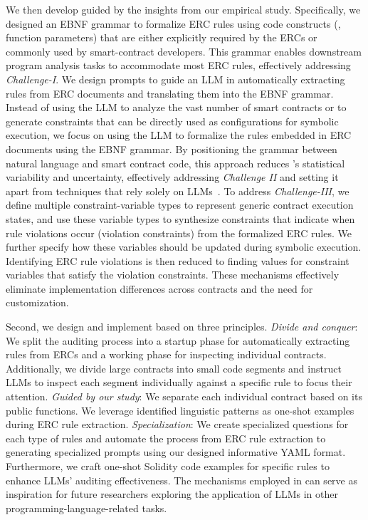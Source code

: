 We then develop \Tool{} guided by the insights from our empirical study. 
Specifically, we designed an EBNF grammar to formalize ERC rules using code constructs (\eg, function parameters) that are either explicitly required by the ERCs 
or commonly used by smart-contract developers. 
This grammar enables downstream program analysis tasks to 
accommodate most ERC rules, effectively addressing \textit{Challenge-I}.
%
We design prompts to guide an LLM in automatically extracting 
rules from ERC documents and translating them into the EBNF grammar. 
Instead of using the LLM to analyze the vast number of smart contracts 
or to generate constraints that can be directly used as configurations 
for symbolic execution, we focus on using the LLM to formalize the rules 
embedded in ERC documents using the EBNF grammar. 
By positioning the grammar between natural language 
and smart contract code, this approach reduces \Tool{}’s statistical variability 
and uncertainty, effectively addressing \textit{Challenge II} and setting it apart from techniques that rely solely on LLMs~\cite{GPT-RyanHarvey,GPT-MichaelDNorman}.
%
To address \textit{Challenge-III}, we define multiple constraint-variable 
types to represent generic contract execution states, 
and use these variable types to synthesize 
constraints that indicate when rule violations occur (violation constraints) from the formalized ERC rules. 
We further specify how these variables should be updated during symbolic execution. 
Identifying ERC rule violations 
is then reduced to finding values for constraint variables 
that satisfy the 
violation constraints. 
These mechanisms 
effectively eliminate implementation differences across contracts and the need for customization.

\fi







Second, we design and implement \Tool{} based on three principles.
\textit{Divide and conquer}: We split the auditing process into a startup 
phase for automatically extracting rules from ERCs and a working phase for inspecting individual contracts. 
Additionally, we divide large contracts into small code segments 
and instruct LLMs to inspect each segment individually against a 
specific rule to focus their attention.
\textit{Guided by our study}: We separate each individual contract based 
on its public functions. We leverage identified linguistic 
patterns as one-shot examples during ERC rule extraction.
\textit{Specialization}: We create specialized questions for each type of 
rules and automate the process from ERC rule extraction to 
generating specialized prompts using our designed informative 
YAML format. Furthermore, we craft one-shot Solidity code 
examples for specific rules to enhance LLMs' auditing effectiveness.
The mechanisms employed in \Tool{} can serve as inspiration for 
future researchers exploring the application of LLMs in other 
programming-language-related tasks.

